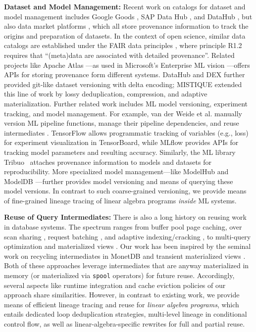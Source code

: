 \textbf{Dataset and Model Management:} Recent work on catalogs for dataset and model management includes Google Goods \cite{HalevyKNOPRW16}, SAP Data Hub \cite{SAPDataHub}, and DataHub \cite{BhardwajBCDEMP15}, but also data market platforms \cite{FernandezSF20}, which all store provenance information to track the origins and preparation of datasets. In the context of open science, similar data catalogs are established under the FAIR data principles \cite{fair2016}, where principle R1.2 requires that ``(meta)data are associated with detailed provenance''. Related projects like Apache Atlas \cite{atlas}---as used in Microsoft's Enterprise ML vision \cite{AgrawalCCFGIJKK20}---offers APIs for storing provenance form different systems. DataHub \cite{BhardwajBCDEMP15} and DEX \cite{ChavanD17} further provided git-like dataset versioning with delta encoding; MISTIQUE \cite{VartakTMZ18} extended this line of work by lossy deduplication, compression, and adaptive materialization. Further related work includes ML model versioning, experiment tracking, and model management. For example, van der Weide et al. manually version ML pipeline functions, manage their pipeline dependencies, and reuse intermediates \cite{WeidePSZK17}. TensorFlow \cite{AbadiBCCDDDGIIK16} allows programmatic tracking of variables (e.g., loss) for experiment visualization in TensorBoard, while MLflow \cite{ZahariaCD0HKMNO18,ChenCDD0HKMMNOP20} provides APIs for tracking model parameters and resulting accuracy. Similarly, the ML library Tribuo~\cite{MachineL29:online} attaches provenance information to models and datasets for reproducibility. More specialized model management---like ModelHub \cite{MiaoLDD17a} and ModelDB \cite{VartakM18}---further provides model versioning and means of querying these model versions. In contrast to such coarse-grained versioning, we provide means of fine-grained lineage tracing of linear algebra programs \emph{inside} ML systems.

\textbf{Reuse of Query Intermediates:} There is also a long history on reusing work in database systems. The spectrum ranges from buffer pool page caching, over scan sharing \cite{UnterbrunnerGAFK09,ArumugamDJPP10}, request batching \cite{LeeZL07}, and adaptive indexing/cracking \cite{IdreosKM07}, to multi-query optimization \cite{RoySSB00} and materialized views \cite{AgrawalCN00,JindalKRP18}. Our work has been inspired by the seminal work on recycling intermediates in MonetDB \cite{IvanovaKNG09,IvanovaKNG10} and transient materialized views \cite{ZhouLFL07}. Both of these approaches leverage intermediates that are anyway materialized in memory (or materialized via \texttt{spool} operators) for future reuse. Accordingly, several aspects like runtime integration and cache eviction policies of our approach share similarities. However, in contrast to existing work, we provide means of efficient lineage tracing and reuse for \emph{linear algebra programs}, which entails dedicated loop deduplication strategies, multi-level lineage in conditional control flow, as well as linear-algebra-specific rewrites for full and partial reuse.

